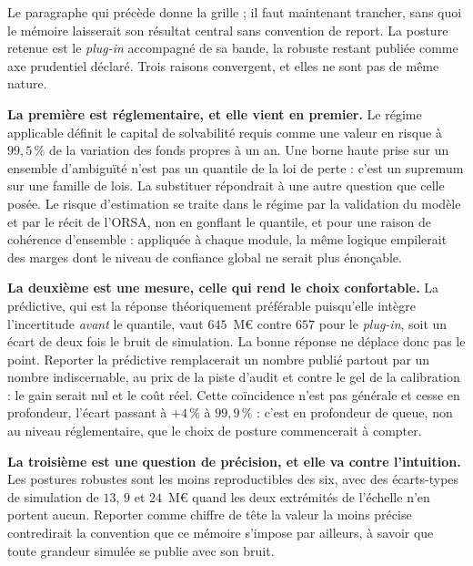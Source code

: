 Le paragraphe qui précède donne la grille ; il faut maintenant trancher, sans quoi le mémoire
laisserait son résultat central sans convention de report. La posture retenue est le
\emph{plug-in} accompagné de sa bande, la robuste restant publiée comme axe prudentiel déclaré.
Trois raisons convergent, et elles ne sont pas de même nature.

\textbf{La première est réglementaire, et elle vient en premier.} Le régime applicable définit le
capital de solvabilité requis comme une valeur en risque à $99{,}5\,\%$ de la variation des fonds
propres à un an. Une borne haute prise sur un ensemble d'ambiguïté n'est pas un quantile de la loi
de perte : c'est un supremum sur une famille de lois. La substituer répondrait à une autre question
que celle posée. Le risque d'estimation se traite dans le régime par la validation du modèle et par
le récit de l'ORSA, non en gonflant le quantile, et pour une raison de cohérence d'ensemble :
appliquée à chaque module, la même logique empilerait des marges dont le niveau de confiance global
ne serait plus énonçable.

\textbf{La deuxième est une mesure, celle qui rend le choix confortable.} La prédictive,
qui est la réponse théoriquement préférable puisqu'elle intègre l'incertitude \emph{avant} le
quantile, vaut $645$~M\euro{} contre $657$ pour le \emph{plug-in}, soit un écart de deux fois le
bruit de simulation. La bonne réponse ne déplace donc pas le point. Reporter la
prédictive remplacerait un nombre publié partout par un nombre indiscernable, au prix de la piste
d'audit et contre le gel de la calibration : le gain serait nul et le coût réel. Cette
coïncidence n'est pas générale et cesse en profondeur, l'écart passant à $+4\,\%$ à
$99{,}9\,\%$ : c'est en profondeur de queue, non au niveau réglementaire, que le choix de posture
commencerait à compter.

\textbf{La troisième est une question de précision, et elle va contre l'intuition.} Les postures
robustes sont les moins reproductibles des six, avec des écarts-types de simulation de $13$, $9$
et $24$~M\euro{} quand les deux extrémités de l'échelle n'en portent aucun. Reporter comme chiffre
de tête la valeur la moins précise contredirait la convention que ce mémoire s'impose par ailleurs,
à savoir que toute grandeur simulée se publie avec son bruit.

